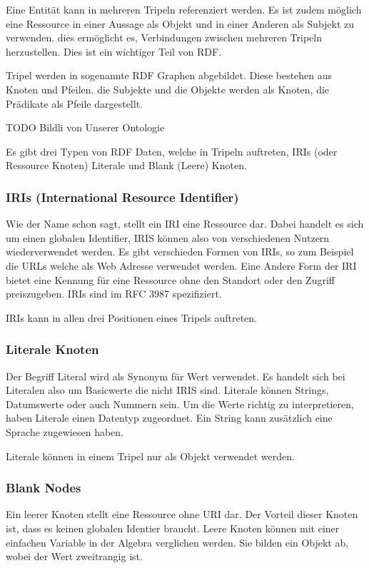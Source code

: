 Eine Entität kann in mehreren Tripeln referenziert werden. Es ist zudem möglich eine Ressource in einer Aussage als Objekt und in einer Anderen als Subjekt zu verwenden. dies ermöglicht es, Verbindungen zwischen mehreren Tripeln herzustellen. Dies ist ein wichtiger Teil von RDF.

Tripel werden in sogenannte RDF Graphen abgebildet. Diese bestehen aus Knoten und Pfeilen. die Subjekte und die Objekte werden als Knoten, die Prädikate als Pfeile dargestellt.



TODO Bildli von Unserer Ontologie

Es gibt drei Typen von RDF Daten, welche in Tripeln auftreten, IRIs (oder Ressource Knoten) Literale und Blank (Leere) Knoten.

\subsubsection{IRIs (International Resource Identifier)}
\label{sec:owlRdf_rdf_dataModel_iris}
Wie der Name schon sagt, stellt ein IRI  eine Ressource dar. Dabei handelt es sich um einen globalen Identifier, IRIS können also von verschiedenen Nutzern wiederverwendet werden. Es gibt verschieden Formen von IRIs, so zum Beispiel die URLs welche als Web Adresse verwendet werden. Eine Andere Form der IRI bietet eine Kennung für eine Ressource ohne den Standort oder den Zugriff preiszugeben. IRIs sind im RFC 3987 spezifiziert.

\noindent\hspace*{15mm}IRIs kann in allen drei Positionen eines Tripels auftreten.

\subsubsection{Literale Knoten}
\label{sec:owlRdf_rdf_dataModel_literal}
Der Begriff Literal wird als Synonym für Wert verwendet. Es handelt sich bei Literalen also um Basicwerte die nicht IRIS sind. Literale können Strings, Datumswerte oder auch Nummern sein. Um die Werte richtig zu interpretieren, haben Literale einen Datentyp zugeordnet. Ein String kann zusätzlich eine Sprache zugewiesen haben.

Literale können in einem Tripel nur als Objekt verwendet werden.

\subsubsection{Blank Nodes}
\label{sec:owlRdf_rdf_dataModel_blankNodes}
Ein leerer Knoten stellt eine Ressource ohne URI dar. Der Vorteil dieser Knoten ist, dass es keinen globalen Identier braucht. Leere Knoten können mit einer einfachen Variable in der Algebra verglichen werden. Sie bilden ein Objekt ab, wobei der Wert zweitrangig ist. 


